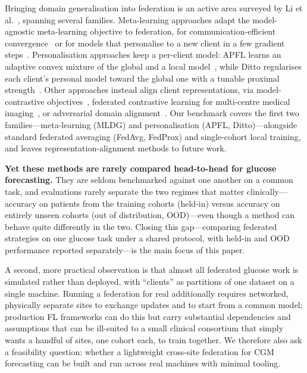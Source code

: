 \documentclass[10pt,letterpaper]{article}
\begin{document}
Bringing domain generalisation into federation is an active area surveyed by Li
et al.~\cite{li2025fedDGsurvey}, spanning several families. Meta-learning approaches adapt the model-agnostic
meta-learning objective to federation, for communication-efficient
convergence~\cite{chen2018fedmeta} or for models that personalise to a new client
in a few gradient steps~\cite{fallah2020perfedavg}. Personalisation approaches keep
a per-client model: APFL learns an adaptive convex mixture of the global and a
local model~\cite{deng2020apfl}, while Ditto regularises each client's personal
model toward the global one with a tunable proximal strength~\cite{li2021ditto}.
Other approaches instead align client representations, via model-contrastive
objectives~\cite{li2021moon}, federated contrastive learning for multi-centre
medical imaging~\cite{fedcl2023}, or adversarial domain
alignment~\cite{flda2023,fedadv2022}. Our benchmark covers the first two
families---meta-learning (MLDG) and personalisation (APFL, Ditto)---alongside
standard federated averaging (FedAvg, FedProx) and single-cohort local training,
and leaves representation-alignment methods to future work.

\textbf{Yet these methods are rarely compared head-to-head for glucose
forecasting.} They are seldom benchmarked against one another on a common task, and
evaluations rarely separate the two regimes that matter clinically---accuracy on
patients from the training cohorts (held-in) versus accuracy on entirely unseen
cohorts (out of distribution, OOD)---even though a method can behave quite
differently in the two. Closing this gap---comparing federated strategies on one
glucose task under a shared protocol, with held-in and OOD performance reported
separately---is the main focus of this paper.

A second, more practical observation is that almost all federated glucose work is
simulated rather than deployed, with ``clients'' as partitions of one dataset on a
single machine. Running a federation for real additionally requires networked,
physically separate sites to exchange updates and to start from a common model;
production FL frameworks can do this but carry substantial dependencies and
assumptions that can be ill-suited to a small clinical consortium that simply wants
a handful of sites, one cohort each, to train together. We therefore also ask a
feasibility question: whether a lightweight cross-site federation for CGM
forecasting can be built and run across real machines with minimal tooling.
\end{document}
